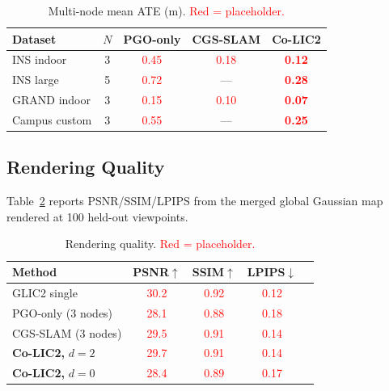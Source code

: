 \begin{table}[t]
  \centering
  \caption{Multi-node mean ATE (m). \textcolor{red}{Red = placeholder.}}
  \label{tab:odom_multi}
  \footnotesize
  \setlength{\tabcolsep}{3pt}
  \begin{tabular}{@{}lcccc@{}}
    \toprule
    Dataset & $N$ & PGO-only & CGS-SLAM & \textbf{Co-LIC2} \\
    \midrule
    INS indoor     & 3 & \textcolor{red}{0.45} & \textcolor{red}{0.18} & \textcolor{red}{\textbf{0.12}} \\
    INS large      & 5 & \textcolor{red}{0.72} & --- & \textcolor{red}{\textbf{0.28}} \\
    GRAND indoor   & 3 & \textcolor{red}{0.15} & \textcolor{red}{0.10} & \textcolor{red}{\textbf{0.07}} \\
    Campus custom  & 3 & \textcolor{red}{0.55} & --- & \textcolor{red}{\textbf{0.25}} \\
    \bottomrule
  \end{tabular}
\end{table}

\subsection{Rendering Quality}

\label{sec:render}

Table~\ref{tab:render} reports PSNR/SSIM/LPIPS from the merged global
Gaussian map rendered at 100 held-out viewpoints.

\begin{table}[t]
  \centering
  \caption{Rendering quality. \textcolor{red}{Red = placeholder.}}
  \label{tab:render}
  \footnotesize
  \setlength{\tabcolsep}{3pt}
  \begin{tabular}{@{}lcccc@{}}
    \toprule
    Method & PSNR$\uparrow$ & SSIM$\uparrow$ & LPIPS$\downarrow$ \\
    \midrule
    GLIC2 single          & \textcolor{red}{30.2} & \textcolor{red}{0.92} & \textcolor{red}{0.12} \\
    PGO-only (3 nodes)    & \textcolor{red}{28.1} & \textcolor{red}{0.88} & \textcolor{red}{0.18} \\
    CGS-SLAM (3 nodes)    & \textcolor{red}{29.5} & \textcolor{red}{0.91} & \textcolor{red}{0.14} \\
    \textbf{Co-LIC2,} $d=2$ & \textcolor{red}{29.7} & \textcolor{red}{0.91} & \textcolor{red}{0.14} \\
    \textbf{Co-LIC2,} $d=0$ & \textcolor{red}{28.4} & \textcolor{red}{0.89} & \textcolor{red}{0.17} \\
    \bottomrule
  \end{tabular}
\end{table}

